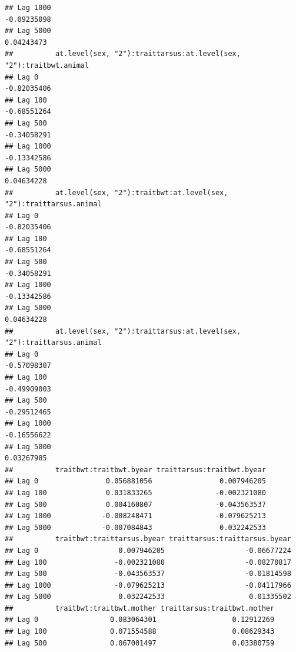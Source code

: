 \documentclass[
  12pt,
]{book}
\begin{document}
\begin{verbatim}
## Lag 1000                                                    -0.09235098
## Lag 5000                                                     0.04243473
##          at.level(sex, "2"):traittarsus:at.level(sex, "2"):traitbwt.animal
## Lag 0                                                          -0.82035406
## Lag 100                                                        -0.68551264
## Lag 500                                                        -0.34058291
## Lag 1000                                                       -0.13342586
## Lag 5000                                                        0.04634228
##          at.level(sex, "2"):traitbwt:at.level(sex, "2"):traittarsus.animal
## Lag 0                                                          -0.82035406
## Lag 100                                                        -0.68551264
## Lag 500                                                        -0.34058291
## Lag 1000                                                       -0.13342586
## Lag 5000                                                        0.04634228
##          at.level(sex, "2"):traittarsus:at.level(sex, "2"):traittarsus.animal
## Lag 0                                                             -0.57098307
## Lag 100                                                           -0.49909003
## Lag 500                                                           -0.29512465
## Lag 1000                                                          -0.16556622
## Lag 5000                                                           0.03267985
##          traitbwt:traitbwt.byear traittarsus:traitbwt.byear
## Lag 0                0.056881056                0.007946205
## Lag 100              0.031833265               -0.002321080
## Lag 500              0.004160807               -0.043563537
## Lag 1000            -0.008248471               -0.079625213
## Lag 5000            -0.007084843                0.032242533
##          traitbwt:traittarsus.byear traittarsus:traittarsus.byear
## Lag 0                   0.007946205                   -0.06677224
## Lag 100                -0.002321080                   -0.08270817
## Lag 500                -0.043563537                   -0.01814598
## Lag 1000               -0.079625213                   -0.04117966
## Lag 5000                0.032242533                    0.01335502
##          traitbwt:traitbwt.mother traittarsus:traitbwt.mother
## Lag 0                 0.083064301                  0.12912269
## Lag 100               0.071554588                  0.08629343
## Lag 500               0.067001497                  0.03380759

\end{verbatim}
\end{document}
